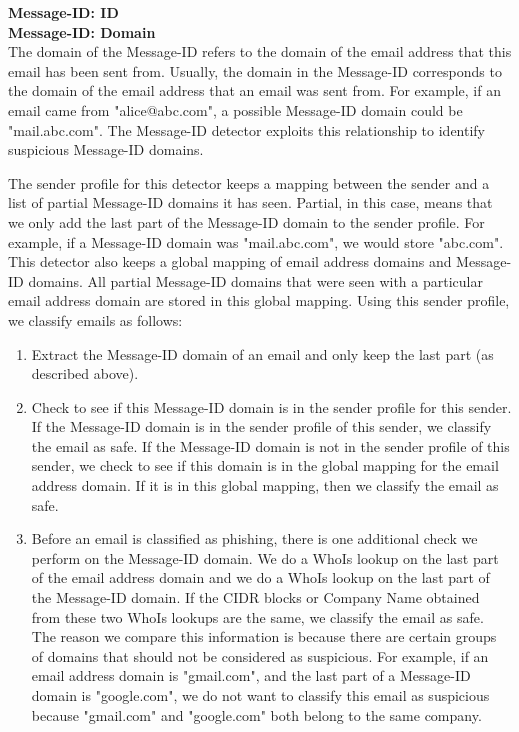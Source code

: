 \documentclass[letterpaper]{article}
\begin{document}
\textbf{Message-ID: ID}\\

\textbf{Message-ID: Domain}\\

The domain of the Message-ID refers to the domain of the email address that this email has been sent from. Usually, the domain in the Message-ID corresponds to the domain of the email address that an email was sent from. For example, if an email came from "alice@abc.com", a possible Message-ID domain could be "mail.abc.com". The Message-ID detector exploits this relationship to identify suspicious Message-ID domains.

The sender profile for this detector keeps a mapping between the sender and a list of partial Message-ID domains it has seen. Partial, in this case, means that we only add the last part of the Message-ID domain to the sender profile. For example, if a Message-ID domain was "mail.abc.com", we would store "abc.com". This detector also keeps a global mapping of email address domains and Message-ID domains. All partial Message-ID domains that were seen with a particular email address domain are stored in this global mapping. Using this sender profile, we classify emails as follows:

\begin{enumerate}
\item Extract the Message-ID domain of an email and only keep the last part (as described above).
\item Check to see if this Message-ID domain is in the sender profile for this sender. If the Message-ID domain is in the sender profile of this sender, we classify the email as safe. If the Message-ID domain is not in the sender profile of this sender, we check to see if this domain is in the global mapping for the email address domain. If it is in this global mapping, then we classify the email as safe.
\item Before an email is classified as phishing, there is one additional check we perform on the Message-ID domain. We do a WhoIs lookup on the last part of the email address domain and we do a WhoIs lookup on the last part of the Message-ID domain. If the CIDR blocks or Company Name obtained from these two WhoIs lookups are the same, we classify the email as safe. The reason we compare this information is because there are certain groups of domains that should not be considered as suspicious. For example, if an email address domain is "gmail.com", and the last part of a Message-ID domain is "google.com", we do not want to classify this email as suspicious because "gmail.com" and "google.com" both belong to the same company.
\end{enumerate}
\end{document}

